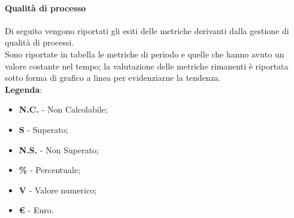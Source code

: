	\paragraph{Qualità di processo}
		Di seguito vengono riportati gli esiti delle metriche derivanti dalla gestione di qualità di processi. \\ Sono riportate in tabella le metriche di periodo e quelle che hanno avuto un valore costante nel tempo; la valutazione delle metriche rimanenti è riportata sotto forma di grafico a linea per evidenziarne la tendenza. \\
\textbf{Legenda}:
\begin{itemize}
	\item \textbf{N.C.} - Non Calcolabile;
	\item \textbf{S} - Superato;
	\item \textbf{N.S.} - Non Superato;
	\item \textbf{\%} - Percentuale;
	\item \textbf{V} - Valore numerico;
	\item \textbf{\euro{}} - Euro.
\end{itemize}
